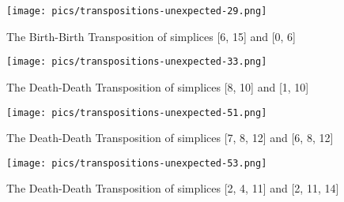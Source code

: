 \documentclass{article}
\begin{document}
    \begin{figure}[ht]
    \centering
    \texttt{[image: pics/transpositions-unexpected-29.png]}
    \label{fig:unexpected29}
    \caption{The Birth-Birth Transposition of simplices [6, 15] and [0, 6]}
    \end{figure}
    
    \begin{figure}[ht]
    \centering
    \texttt{[image: pics/transpositions-unexpected-33.png]}
    \label{fig:unexpected33}
    \caption{The Death-Death Transposition of simplices [8, 10] and [1, 10]}
    \end{figure}
    
    \begin{figure}[ht]
    \centering
    \texttt{[image: pics/transpositions-unexpected-51.png]}
    \label{fig:unexpected51}
    \caption{The Death-Death Transposition of simplices [7, 8, 12] and [6, 8, 12]}
    \end{figure}
    
    \begin{figure}[ht]
    \centering
    \texttt{[image: pics/transpositions-unexpected-53.png]}
    \label{fig:unexpected53}
    \caption{The Death-Death Transposition of simplices [2, 4, 11] and [2, 11, 14]}
    \end{figure}
    
\end{document}
